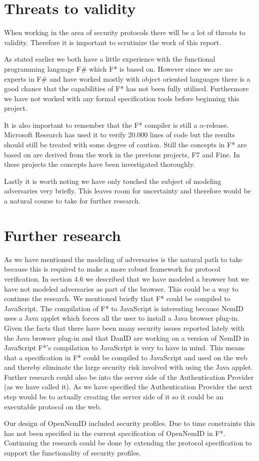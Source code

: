 \documentclass[twosided]{report}
\begin{document}
\section{Threats to validity}
When working in the area of security protocols there will be a lot of threats to validity. Therefore it is important to scrutinize the work of this report.
\par
As stated earlier we both have a little experience with the functional programming language F\# which F* is based on. However since we are no experts in F\# and have worked mostly with object oriented languages there is a good chance that the capabilities of F* has not been fully utilized. Furthermore we have not worked with any formal specification tools before beginning this project.
\par
It is also important to remember that the F* compiler is still a $\alpha$-release. Microsoft Research has used it to verify 20.000 lines of code \cite{fstar-msr} but the results should still be treated with some degree of caution. Still the concepts in F* are based on are derived from the work in the previous projects, F7 and Fine. In these projects the concepts have been investigated thoroughly.
\par
Lastly it is worth noting we have only touched the subject of modeling adversaries very briefly. This leaves room for uncertainty and therefore would be a natural course to take for further research.
\section{Further research}
As we have mentioned the modeling of adversaries is the natural path to take because this is required to make a more robust framework for protocol verification. In section 4.6 we described that we have modeled a browser but we have not modeled adversaries as part of the browser. This could be a way to continue the research. We mentioned briefly that F* could be compiled to JavaScript. The compilation of F* to JavaScript is interesting because NemID uses a Java applet which forces all the user to install a Java browser plug-in. Given the facts that there have been many security issues reported lately with the Java browser plug-in and that DanID are working on a version of NemID in JavaScript F*'s compilation to JavaScript is very to have in mind. This means that a specification in F* could be compiled to JavaScript and used on the web and thereby eliminate the large security risk involved with using the Java applet. Further research could also be into the server side of the Authentication Provider (as we have called it). As we have specified the Authentication Provider the next step would be to actually creating the server side of it so it could be an executable protocol on the web.
\par
Our design of OpenNemID included security profiles. Due to time constraints this has not been specified in the current specification of OpenNemID in F*. Continuing the research could be done by extending the protocol specification to support the functionality of security profiles.
\end{document}
